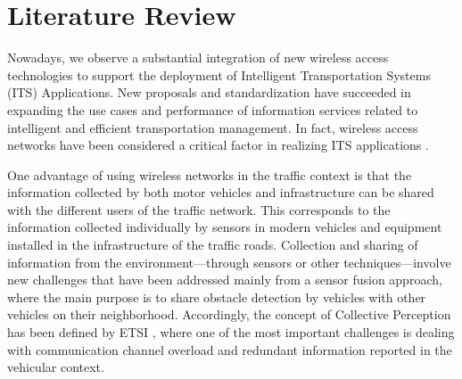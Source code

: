 
\chapter{Literature Review}
Nowadays, we observe a substantial integration of new wireless access technologies to support the deployment of Intelligent Transportation Systems (ITS) Applications. New proposals and standardization have succeeded in expanding the use cases and performance of information services related to intelligent and efficient transportation management. In fact, wireless access networks have been considered a critical factor in realizing ITS applications \cite{5GAA}. 

One advantage of using wireless networks in the traffic context is that the information collected by both motor vehicles and infrastructure can be shared with the different users of the traffic network. This corresponds to the information collected individually by sensors in modern vehicles and equipment installed in the infrastructure of the traffic roads. Collection and sharing of information from the environment---through sensors or other techniques---involve new challenges that have been addressed mainly from a sensor fusion approach, where the main purpose is to share obstacle detection by vehicles with other vehicles on their neighborhood. Accordingly, the concept of Collective Perception has been defined by ETSI \cite{ETSI}, where one of the most important challenges is dealing with communication channel overload and redundant information reported in the vehicular context. 

